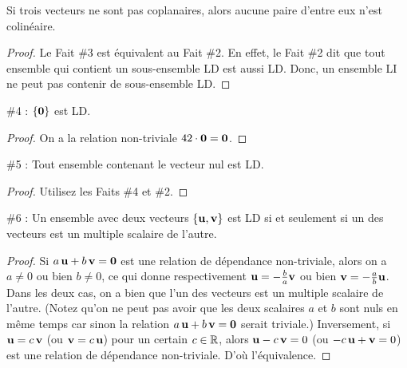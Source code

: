 \begin{myexample} Si trois vecteurs ne sont pas coplanaires, alors aucune paire d'entre eux n'est
colinéaire.
\end{myexample}

\begin{proof} Le Fait \#3 est équivalent au Fait \#2.  
En effet, le Fait \#2 dit que tout ensemble qui contient un sous-ensemble LD est aussi LD.
Donc, un ensemble LI ne peut pas contenir de sous-ensemble LD.
\end{proof}

\begin{fac} \#4 : $\{ \mathbf{0}\}$ est LD.\end{fac}

\begin{proof}
	On a la relation non-triviale $42\cdot \mathbf{0} = \mathbf{0}$.
\end{proof}

\begin{fac}\#5 : Tout ensemble contenant le vecteur nul est LD.\end{fac}

\begin{proof} Utilisez les Faits \#4 et \#2. \end{proof}


\begin{fac} \#6 : Un ensemble avec deux vecteurs $\{\mathbf{u},\mathbf{v}\}$ est LD si et seulement si un des vecteurs est un multiple scalaire de l'autre.\end{fac}

\begin{proof} Si $a\,\mathbf{u} + b\,\mathbf{v} = \mathbf{0}$ est une relation de dépendance non-triviale, alors on a 
$a\neq 0$ ou bien $b\neq 0$, ce qui donne respectivement $\mathbf{u} = -\frac{b}{a} \mathbf{v}$ 
ou bien $\mathbf{v} =-\frac{a}{b} \mathbf{u}$. Dans les deux cas, on a bien que l'un des vecteurs est un multiple scalaire de l'autre.
(Notez qu'on ne peut pas avoir que les deux scalaires $a$ et $b$ sont nuls en même temps car sinon la relation $a\,\mathbf{u} + b\,\mathbf{v} = \mathbf{0}$ serait triviale.)
Inversement, si $\mathbf{u}= c\, \mathbf{v}$ (ou $\mathbf{v}=c\,\mathbf{u}$) pour un certain $c\in \mathbb{R}$, alors $\mathbf{u}-c\,\mathbf{v}=0$ (ou $-c\,\mathbf{u}+\mathbf{v}=0$) est une relation de dépendance non-triviale. D'où l'équivalence.
 \end{proof}


